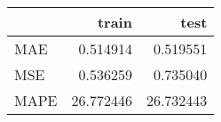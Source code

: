 \begin{tabular}{lrr}
\toprule
{} &      train &       test \\
\midrule
MAE  &   0.514914 &   0.519551 \\
MSE  &   0.536259 &   0.735040 \\
MAPE &  26.772446 &  26.732443 \\
\bottomrule
\end{tabular}
